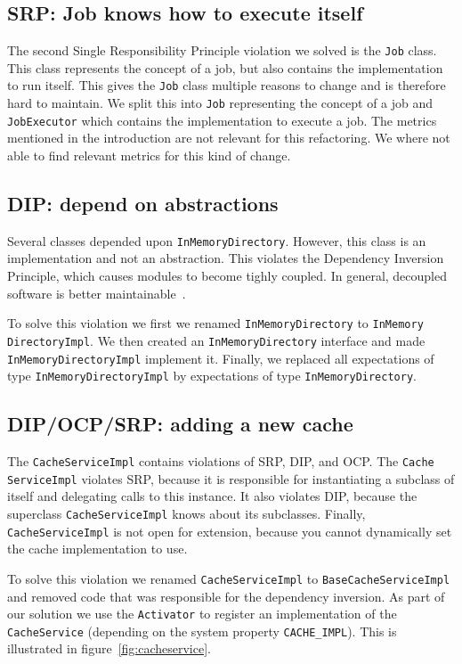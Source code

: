 \documentclass{article}
\begin{document}
\subsection{SRP: Job knows how to execute itself}
The second Single Responsibility Principle violation we solved is the \verb|Job| class. This class represents the concept of a job, but also contains the implementation to run itself. This gives the \verb|Job| class multiple reasons to change and is therefore hard to maintain.
We split this into \verb|Job| representing the concept of a job and \verb|JobExecutor| which contains the implementation to execute a job. The metrics mentioned in the introduction are not relevant for this refactoring. We where not able to find relevant metrics for this kind of change.


\subsection{DIP: depend on abstractions}
Several classes depended upon \verb|InMemoryDirectory|. However, this class is an implementation and not an abstraction. This violates the Dependency Inversion Principle, which causes modules to become tighly coupled. In general, decoupled software is better maintainable~\cite{martin2003agile}.

To solve this violation we first we renamed \verb|InMemoryDirectory| to \texttt{InMemory DirectoryImpl}. We then created an \texttt{InMemoryDirectory} interface and made \verb|InMemoryDirectoryImpl| implement it. Finally, we replaced all expectations of type \verb|InMemoryDirectoryImpl| by expectations of type \verb|InMemoryDirectory|.

\subsection{DIP/OCP/SRP: adding a new cache}
The \verb|CacheServiceImpl| contains violations of SRP, DIP, and OCP. The \texttt{Cache ServiceImpl} violates SRP, because it is responsible for instantiating a subclass of itself and delegating calls to this instance. It also violates DIP, because the superclass \verb|CacheServiceImpl| knows about its subclasses. Finally, \verb|CacheServiceImpl| is not open for extension, because you cannot dynamically set the cache implementation to use.

To solve this violation we renamed \verb|CacheServiceImpl| to \texttt{BaseCacheServiceImpl} and removed code that was responsible for the dependency inversion. As part of our solution we use the \verb|Activator| to register an implementation of the \verb|CacheService| (depending on the system property \verb|CACHE_IMPL|). This is illustrated in figure~\ref{fig:cacheservice}.
\end{document}
